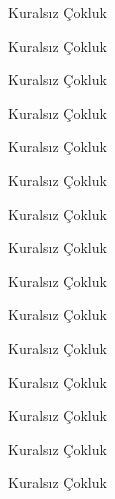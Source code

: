 \begin{kip}{}{Kuralsız Çokluk}
\end{kip}

\begin{kip}{}{Kuralsız Çokluk}
\end{kip}

\begin{kip}{}{Kuralsız Çokluk}
\end{kip}

\begin{kip}{}{Kuralsız Çokluk}
\end{kip}

\begin{kip}{}{Kuralsız Çokluk}
\end{kip}

\begin{kip}{}{Kuralsız Çokluk}
\end{kip}

\begin{kip}{}{Kuralsız Çokluk}
\end{kip}

\begin{kip}{}{Kuralsız Çokluk}
\end{kip}

\begin{kip}{}{Kuralsız Çokluk}
\end{kip}

\begin{kip}{}{Kuralsız Çokluk}
\end{kip}

\begin{kip}{}{Kuralsız Çokluk}
\end{kip}

\begin{kip}{}{Kuralsız Çokluk}
\end{kip}

\begin{kip}{}{Kuralsız Çokluk}
\end{kip}

\begin{kip}{}{Kuralsız Çokluk}
\end{kip}

\begin{kip}{}{Kuralsız Çokluk}
\end{kip}

